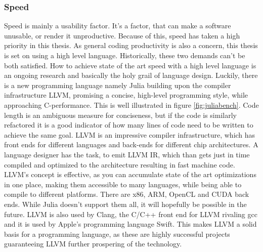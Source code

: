 \subsubsection{Speed}
Speed is mainly a usability factor. It's a factor, that can make a software unusable, or render it unproductive. Because of this, speed has taken a high priority in this thesis. As general coding productivity is also a concern, this thesis is set on using a high level language.
Historically, these two demands can't be both satisfied.
How to achieve state of the art speed with a high level language is an ongoing research and basically the holy grail of language design.
Luckily, there is a new programming language namely Julia building upon the compiler infrastructure \ac{LLVM}, promising a concise, high-level programming style, while approaching C-performance.
This is well illustrated in figure \ref{fig:juliabench}. Code length is an ambiguous measure for conciseness, but if the code is similarly refactored it is a good indicator of how many lines of code need to be written to achieve the same goal.
\ac{LLVM} is an impressive compiler infrastructure, which has front ends for different languages and back-ends for different chip architectures. 
A language designer has the task, to emit \ac{LLVM} \ac{IR}, which than gets just in time compiled and optimized to the architecture resulting in fast machine code.
\ac{LLVM}'s concept is effective, as you can accumulate state of the art optimizations in one place, making them accessible to many languages, while being able to compile to different platforms. There are x86, ARM, \ac{OpenCL} and CUDA back ends. While Julia doesn't support them all, it will hopefully be possible in the future. 
\ac{LLVM} is also used by Clang, the C/C++ front end for \ac{LLVM} rivaling \ac{gcc} and it is used by Apple's programming language Swift. 
This makes \ac{LLVM} a solid basis for a programming language, as these are highly successful projects guaranteeing \ac{LLVM} further prospering of the technology.

